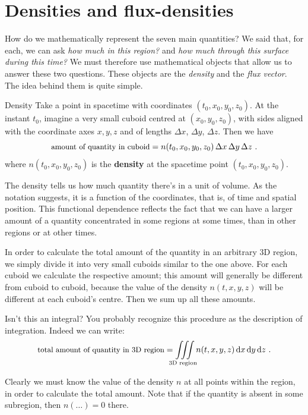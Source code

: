 \documentclass[a4paper,12pt,%
onecolumn,oneside,titlepage,%
british%
]{memoir}
\newcommand*{\di}{\mathrm{d}}%
\newcommand*{\incr}{\Delta}%
\renewcommand*{\|}[1][]{\nonscript\:#1\vert\nonscript\:\mathopen{}}
\newcommand*{\yti}{t_{0}}
\newcommand*{\yxi}{x_{0}}
\newcommand*{\yyi}{y_{0}}
\newcommand*{\yzi}{z_{0}}
\newcommand*{\Dx}{\incr x}
\newcommand*{\Dy}{\incr y}
\newcommand*{\Dz}{\incr z}
\begin{document}
\smallskip


\printpagenotes*
\clearpage
\chapter{Densities and flux-densities}
\label{ncha:density_fluxdensity}


How do we mathematically represent the seven main quantities? We said that, for each, we can ask \emph{how much in this region?} and \emph{how much through this surface during this time?} We must therefore use mathematical objects that allow us to answer these two questions. These objects are the \emph{density} and the \emph{flux vector}. The idea behind them is quite simple.


\begin{definition}{Density}
  Take a point in spacetime with coordinates $(\yti,\yxi,\yyi,\yzi)$. At the instant $\yti$, imagine a very small cuboid centred at $(\yxi,\yyi,\yzi)$, with sides aligned with the coordinate axes $x,y,z$ and of lengths $\Dx$, $\Dy$, $\Dz$. Then we have
  \begin{equation}
    \label{neq:density_expl}
    \text{\small amount of quantity in cuboid} = 
    n(\yti,\yxi,\yyi,\yzi)\, \Dx\, \Dy\, \Dz \ .
  \end{equation}
  where $n(\yti,\yxi,\yyi,\yzi)$ is the \textbf{density} at the spacetime point $(\yti,\yxi,\yyi,\yzi)$.
\end{definition}
The density tells us how much quantity there's in a unit of volume. As the notation suggests, it is a function of the coordinates, that is, of time and spatial position. This functional dependence reflects the fact that we can have a larger amount of a quantity concentrated in some regions at some times, than in other regions or at other times.

In order to calculate the total amount of the quantity in an arbitrary 3D region, we simply divide it into very small cuboids similar to the one above. For each cuboid we calculate the respective amount; this amount will generally be different from cuboid to cuboid, because the value of the density $n(t,x,y,z)$ will be different at each cuboid's centre. Then we sum up all these amounts.

\begin{extra}{Isn't this an integral?}
  You probably recognize this procedure as the description of integration. Indeed we can write:
  \begin{equation}
    \label{neq:density_integral}
    \text{\small total amount of quantity in 3D region} = 
    \iiint\limits_{\mathclap{\text{3D region}}}n(t,x,y,z)\, \di x\, \di y\, \di z \ .
  \end{equation}
\end{extra}
Clearly we must know the value of the density $n$ at all points within the region, in order to calculate the total amount. Note that if the quantity is absent in some subregion, then $n(\dotso)=0$ there.
\end{document}
